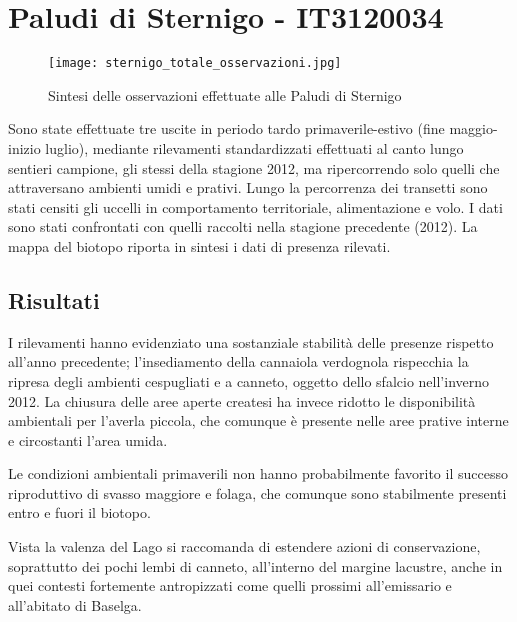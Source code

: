 \documentclass[11pt,a4paper,twoside]{memoir}
\begin{document}
\newpage
\section{Paludi di Sternigo - IT3120034}
\vspace*{\fill}
\begin{figure}[H]
  \centering
  \texttt{[image: sternigo\_totale\_osservazioni.jpg]}
  \caption{Sintesi delle osservazioni effettuate alle Paludi di Sternigo}
\end{figure}\vspace*{\fill}

Sono state effettuate tre uscite in periodo tardo primaverile-estivo (fine maggio-inizio luglio), mediante rilevamenti standardizzati effettuati al canto lungo sentieri campione, gli stessi della stagione 2012, ma ripercorrendo solo quelli che attraversano ambienti umidi e prativi. Lungo la percorrenza dei transetti sono stati censiti gli uccelli in comportamento territoriale, alimentazione e volo. I dati sono stati confrontati con quelli raccolti nella stagione precedente (2012). La mappa del biotopo riporta in sintesi i dati di presenza rilevati.

\subsection{Risultati}

I rilevamenti hanno evidenziato una sostanziale stabilità delle presenze rispetto all’anno precedente; l’insediamento della cannaiola verdognola rispecchia la ripresa degli ambienti cespugliati e a canneto, oggetto dello sfalcio nell’inverno 2012. La chiusura delle aree aperte createsi ha invece ridotto le disponibilità ambientali per l’averla piccola, che comunque è presente nelle aree prative interne e circostanti l’area umida.

Le condizioni ambientali primaverili non hanno probabilmente favorito il successo riproduttivo di svasso maggiore e folaga, che comunque sono stabilmente presenti entro e fuori il biotopo.

Vista la valenza del Lago si raccomanda di estendere azioni di conservazione, soprattutto dei pochi lembi di canneto, all’interno del margine lacustre, anche in quei contesti fortemente antropizzati come quelli prossimi all’emissario e all’abitato di Baselga.
\end{document}
